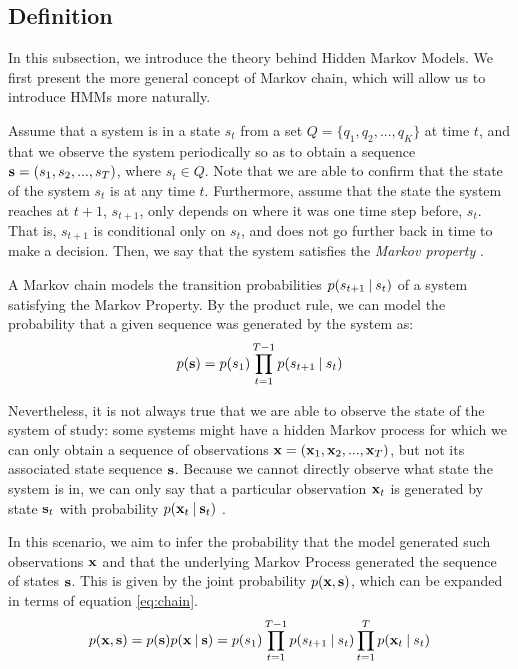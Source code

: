 \documentclass[../main.tex]{subfiles}
\begin{document}
\subsection{Definition} \label{subsection_defhmms}
In this subsection, we introduce the theory behind Hidden Markov Models. We first present the more general concept of Markov chain, which will allow us to introduce HMMs more naturally. 
\par Assume that a system is in a state $s_t$ from a set $Q = \{ q_1, q_2, ..., q_K \}$ at time $t$, and that we observe the system periodically so as to obtain a sequence $\mathbf{s} = \left( s_1, s_2, ..., s_T \right)$, where $s_t \in Q$. Note that we are able to confirm that the state of the system $s_t$ is at any time $t$. Furthermore, assume that the state the system reaches at $t+1$, $s_{t+1}$, only depends on where it was one time step before, $s_t$. That is, $s_{t+1}$ is conditional only on $s_{t}$, and does not go further back in time to make a decision. Then, we say that the system satisfies the \emph{Markov property} \cite{Murphy2012}.
\par A Markov chain models the transition probabilities $p(s_{t+1} \:\vert\: s_t)$ of a system satisfying the Markov Property. By the product rule, we can model the probability that a given sequence was generated by the system as:
\begin{equation}\label{eq:chain}
p(\mathbf{s}) = p(s_1)\prod_{t=1}^{T-1}p(s_{t+1} \:\vert\: s_t)
\end{equation}
\par Nevertheless, it is not always true that we are able to observe the state of the system of study: some systems might have a  hidden Markov process for which we can only obtain a sequence of observations $\mathbf{x} = \left( \mathbf{x}_1, \mathbf{x}_2, ..., \mathbf{x}_T \right)$, but not its associated state sequence $\mathbf{s}$. Because we cannot directly observe what state the system is in, we can only say that a particular observation $\mathbf{x}_t$ is generated by state $\mathbf{s}_t$ with probability $p(\mathbf{x}_t \:\vert\: \mathbf{s}_t)$ \cite{Murphy2012}. 
\par In this scenario, we aim to infer the probability that the model generated such observations $\mathbf{x}$ and that the underlying Markov Process generated the sequence of states $\mathbf{s}$. This is given by the joint probability $p(\mathbf{x}, \mathbf{s})$, which can be expanded in terms of equation \ref{eq:chain}.
\begin{equation}\label{eq:hmm}
p(\mathbf{x}, \mathbf{s}) = p(\mathbf{s})p(\mathbf{x} \:\vert\: \mathbf{s}) = p(s_1)\prod_{t=1}^{T-1}p(s_{t+1}\:\vert\: s_t)\prod_{t=1}^Tp(\mathbf{x}_t \:\vert\: s_t)
\end{equation} 
\end{document}
